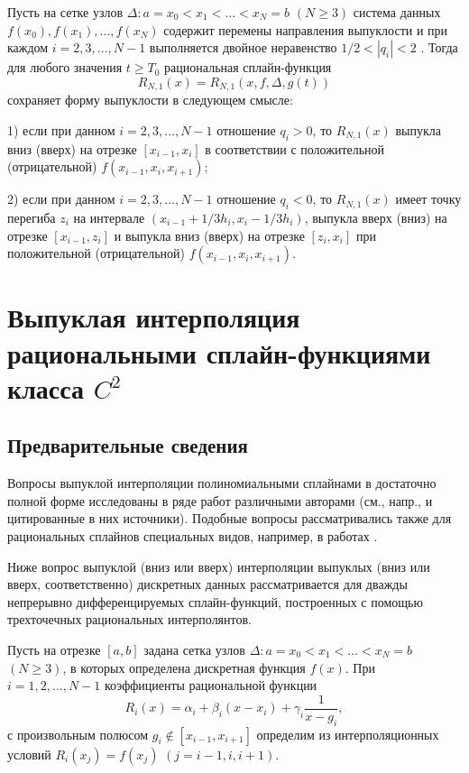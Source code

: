 \begin{theorem}\label{ark-teor2}
Пусть на сетке узлов $\Delta: a=x_0<x_1<\dots<x_N=b$
$(N\geqslant 3)$ система данных $f(x_0), f(x_1),\dots,f(x_N)$  содержит перемены направления
выпуклости и при каждом $i=2,3,\dots,N-1$ выполняется двойное неравенство $1/2<|q_i|<2$ .
Тогда для любого значения $t\geqslant T_0$ рациональная сплайн-функция
 $$R_{N,1}(x)=R_{N,1} (x, f, \Delta, g(t))$$ сохраняет форму выпуклости в следующем смысле{:}

1) если при данном $i=2,3,\dots,N-1$ отношение $q_i>0$, то $R_{N,1}(x)$ выпукла вниз {(}вверх{)} на
отрезке $[x_{i-1}, x_i]$ в соответствии с положительной {(}отрицательной{)} $f(x_{i-1},x_i,x_{i+1})${;}

2) если при данном $i=2,3,\dots,N-1$ отношение $q_i<0$, то $R_{N,1}(x)$ имеет точку перегиба
$z_i$ на интервале $\left(x_{i-1}+ 1/3h_i, x_i-1/3 h_i\right)$, выпукла вверх {(}вниз{)} на
отрезке $[x_{i-1}, z_i]$ и выпукла вниз {(}вверх{)} на отрезке $[z_i, x_i]$
при положительной {(}отрицательной{)} $f(x_{i-1},x_i,x_{i+1})$.
 \end{theorem}

 \chapter{Выпуклая интерполяция рациональными сплайн-функциями класса $C^2$}
\section{Предварительные сведения}

Вопросы выпуклой интерполяции полиномиальными сплайнами в достаточно полной
форме исследованы в ряде работ различными авторами (см., напр., \cite{ark-1, ark-2, ark-3, ark-4, ark-5} и цитированные
в них источники). Подобные вопросы рассматривались также для рациональных сплайнов специальных
видов, например, в работах \cite{ark-8, ark-9, ark-10, ark-11}.

Ниже вопрос выпуклой (вниз или вверх) интерполяции выпуклых (вниз или вверх, соответственно)
дискретных данных рассматривается  для дважды непрерывно дифференцируемых сплайн-функций, построенных с помощью
 трехточечных рациональных интерполянтов.

Пусть на отрезке $[a,b]$ задана сетка узлов
$\Delta: a=x_0<x_1<\dots<x_N=b$ $(N\geqslant 3)$, в которых определена дискретная функция $f(x)$.
При $i=1,2,\dots, N-1$  коэффициенты рациональной функции
\begin{equation*}
R_i(x)=\alpha_i+\beta_i (x-x_i)+\gamma_i \frac 1{x-g_i},
\end{equation*}
с произвольным полюсом $g_i\not \in [x_{i-1}, x_{i+1}]$ определим из интерполяционных условий
$R_i(x_j)=f(x_j)$ $(j=i-1,i,i+1)$.

